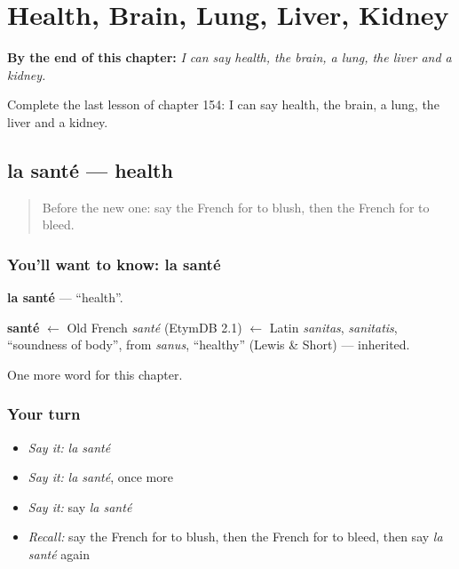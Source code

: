 
\chapter{Health, Brain, Lung, Liver, Kidney}
\label{ch:fr-health-brain-lung-liver-kidney}

\begin{chapteropening}
\textbf{By the end of this chapter:} \emph{I can say health, the brain, a lung, the liver and a kidney.}

Complete the last lesson of chapter 154: I can say health, the brain, a lung, the liver and a kidney.
\end{chapteropening}

\section[la santé]{la santé — health}

\label{lesson:FR-C154-sante}



\begin{quote}
Before the new one: say the French for to blush, then the French for to bleed.
\end{quote}

\subsection*{You'll want to know: la santé}
\textbf{la santé} — \textquotedblleft{}health\textquotedblright{}.

\begin{cousinweb}
\textbf{santé} $\leftarrow$ Old French \emph{santé} (EtymDB 2.1) $\leftarrow$ Latin \emph{sanitas}, \emph{sanitatis}, \textquotedblleft{}soundness of body\textquotedblright{}, from \emph{sanus}, \textquotedblleft{}healthy\textquotedblright{} (Lewis \& Short) — inherited.
\end{cousinweb}

\begin{grammarlens}[title={What you've built}]
One more word for this chapter.
\end{grammarlens}

\subsection*{Your turn}
\begin{itemize}
\raggedright
  \item \emph{Say it:} \emph{la santé}
  \item \emph{Say it:} \emph{la santé}, once more
  \item \emph{Say it:} say \emph{la santé}
  \item \emph{Recall:} say the French for to blush, then the French for to bleed, then say \emph{la santé} again
\end{itemize}

